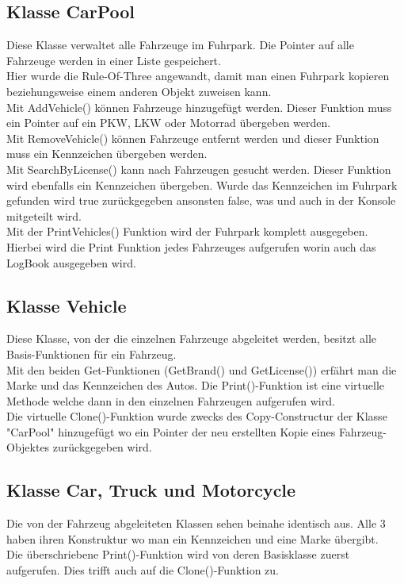 \subsection{Klasse CarPool}
Diese Klasse verwaltet alle Fahrzeuge im Fuhrpark. Die Pointer auf alle Fahrzeuge werden in einer Liste gespeichert. \\
Hier wurde die Rule-Of-Three angewandt, damit man einen Fuhrpark kopieren beziehungsweise einem anderen Objekt zuweisen kann.\\
Mit AddVehicle() können Fahrzeuge hinzugefügt werden. Dieser Funktion muss ein Pointer auf ein PKW, LKW oder Motorrad übergeben werden. \\
Mit RemoveVehicle() können Fahrzeuge entfernt werden und dieser Funktion muss ein Kennzeichen übergeben werden. \\
Mit SearchByLicense() kann nach Fahrzeugen gesucht werden. Dieser Funktion wird ebenfalls ein Kennzeichen übergeben. Wurde das Kennzeichen im Fuhrpark gefunden wird true zurückgegeben ansonsten false, was und auch in der Konsole mitgeteilt wird. \\
Mit der PrintVehicles() Funktion wird der Fuhrpark komplett ausgegeben. Hierbei wird die Print Funktion jedes Fahrzeuges aufgerufen worin auch das LogBook ausgegeben wird.

\subsection{Klasse Vehicle}
Diese Klasse, von der die einzelnen Fahrzeuge abgeleitet werden, besitzt alle Basis-Funktionen für ein Fahrzeug.\\
Mit den beiden Get-Funktionen (GetBrand() und GetLicense()) erfährt man die Marke und das Kennzeichen des Autos. Die Print()-Funktion ist eine virtuelle Methode welche dann in den einzelnen Fahrzeugen aufgerufen wird. \\
Die virtuelle Clone()-Funktion wurde zwecks des Copy-Constructur der Klasse "CarPool" hinzugefügt wo ein Pointer der neu erstellten Kopie eines Fahrzeug-Objektes zurückgegeben wird. 

\subsection{Klasse Car, Truck und Motorcycle}
Die von der Fahrzeug abgeleiteten Klassen sehen beinahe identisch aus. Alle 3 haben ihren Konstruktur wo man ein Kennzeichen und eine Marke übergibt.\\
Die überschriebene Print()-Funktion wird von deren Basisklasse zuerst aufgerufen. Dies trifft auch auf die Clone()-Funktion zu. 


